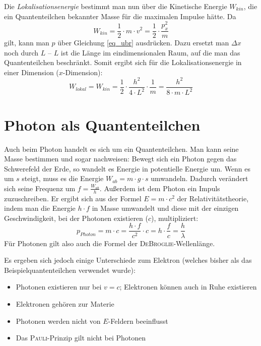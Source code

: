 Die \emph{Lokalisationsenergie} bestimmt man nun über die Kinetische Energie $W_{kin}$, die ein Quantenteilchen bekannter Masse für die maximalen Impulse hätte. Da
\begin{equation}
   W_{kin} = \frac{1}{2} \cdot m \cdot v^2 = \frac{1}{2} \cdot \frac{p_x^2}{m}
\end{equation}
gilt, kann man $p$ über Gleichung \ref{eq_ubr} ausdrücken. Dazu ersetzt man $\Delta x$ noch durch $L$ -- $L$ ist die Länge im eindimensionalen Raum, auf die man das Quantenteilchen beschränkt. Somit ergibt sich für die Lokalisationsenergie in einer Dimension ($x$-Dimension):
\begin{equation}
   W_{lokal} = W_{kin} = \frac{1}{2} \cdot \frac{h^2}{4 \cdot L^2} \cdot \frac{1}{m} = \frac{h^2}{8 \cdot m \cdot L^2}
\end{equation}







\section{Photon als Quantenteilchen}

Auch beim Photon handelt es sich um ein Quantenteilchen. Man kann seine Masse bestimmen und sogar nachweisen: Bewegt sich ein Photon gegen das Schwerefeld der Erde, so wandelt es Energie in potentielle Energie um. Wenn es um $s$ steigt, muss es die Energie $W_{ab} = m \cdot g \cdot s$ umwandeln. Dadurch verändert sich seine Frequenz um $f = \frac{W_{ab}}{h}$. Außerdem ist dem Photon ein Impuls zuzuschreiben. Er ergibt sich aus der Formel $E = m \cdot c^2$ der Relativitätstheorie, indem man die Energie $h \cdot f$ in Masse umwandelt und diese mit der einzigen Geschwindigkeit, bei der Photonen existieren ($c$), multipliziert:
\begin{equation}
   p_{Photon} = m \cdot c = \frac{h \cdot f}{c^2} \cdot c = h \cdot \frac{f}{c} = \frac{h}{\lambda}
\end{equation}
Für Photonen gilt also auch die Formel der \textsc{DeBroglie}-Wellenlänge.


Es ergeben sich jedoch einige Unterschiede zum Elektron (welches bisher als das Beispielquantenteilchen verwendet wurde):
\begin{itemize}
   \item Photonen existieren nur bei $v = c$; Elektronen können auch in Ruhe existieren
   \item Elektronen gehören zur Materie
   \item Photonen werden nicht von $E$-Feldern beeinflusst
   \item Das \textsc{Pauli}-Prinzip gilt nicht bei Photonen
\end{itemize}

